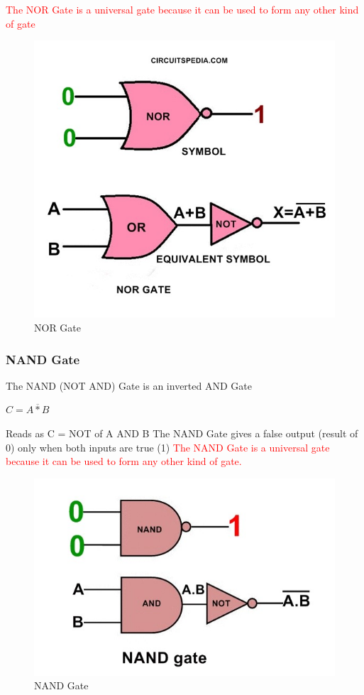 \documentclass{article}
\begin{document}
					\textcolor{red}{The NOR Gate is a universal gate because it can be used to form any other kind of gate}
					\begin{figure}[h!]
						\caption{NOR Gate}
						\label{fig 4: NOR Gate}
						\begin{center}
							\includegraphics[width=0.5\linewidth]{pictures/NOR Gate.jpg}
						\end{center}
					\end{figure}
					
				\subsubsection{NAND Gate}
					The NAND (NOT AND) Gate is an inverted AND Gate
					\begin{center}
						\begin{math}
							C = \overline{A * B}
						\end{math}
					\end{center}
					Reads as C = NOT of A AND B
					The NAND Gate gives a false output (result of 0) only when both inputs are true (1)
					\newline
					\textcolor{red}{The NAND Gate is a universal gate because it can be used to form any other kind of gate.}
						\begin{figure}[h!]
							\caption{NAND Gate}
							\label{fig 5: NAND Gate}
							\begin{center}
								\includegraphics[width=0.5\linewidth]{pictures/NAND Gate.jpg}
							\end{center}
						\end{figure}
				
\end{document}
